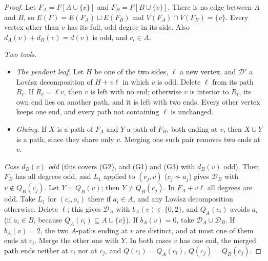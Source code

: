 \documentclass[11pt]{amsart}
\theoremstyle{definition}
\newcommand{\cD}{\mathcal D}
\begin{document}
\begin{proof}
Let $F_A=F[A\cup\{v\}]$ and $F_B=F[B\cup\{v\}]$. There is no edge between $A$ and $B$, so
$E(F)=E(F_A)\sqcup E(F_B)$ and $V(F_A)\cap V(F_B)=\{v\}$. Every vertex other than $v$ has its full,
odd degree in its side. Also $d_A(v)+d_B(v)=d(v)$ is odd, and $c_i\in A$.

\emph{Two tools.}
\begin{itemize}
\item \emph{The pendant leaf.} Let $H$ be one of the two sides, $\ell$ a new vertex, and $\cD'$ a
Lov\'asz decomposition of $H+v\ell$ in which $v$ is odd. Delete $\ell$ from its path $R_\ell$. If $R_\ell=\ell v$, then $v$ is
left with no end; otherwise $v$ is interior to $R_\ell$, its own end lies on another path, and it is left with two ends. Every other
vertex keeps one end, and every path not containing $\ell$ is unchanged.
\item \emph{Gluing.} If $X$ is a path of $F_A$ and $Y$ a path of $F_B$, both ending at $v$, then $X\cup Y$
is a path, since they share only $v$. Merging one such pair removes two ends at $v$.
\end{itemize}

\emph{Case $d_B(v)$ odd} (this covers (G2), and (G1) and (G3) with $d_B(v)$ odd). Then $F_B$ has all
degrees odd, and $L_1$ applied to $(c_j,v)$ ($c_j\not\sim a_j$) gives $\cD_B$ with $v\notin Q_B(c_j)$.
Let $Y=Q_B(v)$; then $Y\ne Q_B(c_j)$. In $F_A+v\ell$ all degrees are odd. Take $L_1$ for
$(c_i,a_i)$ there if $a_i\in A$, and any Lov\'asz decomposition otherwise. Delete $\ell$; this gives $\cD_A$
with $b_A(v)\in\{0,2\}$, and $Q_A(c_i)$ avoids $a_i$ (if $a_i\in B$, because $Q_A(c_i)\subseteq A\cup\{v\}$). If $b_A(v)=0$,
take $\cD_A\cup\cD_B$. If $b_A(v)=2$, the two $A$-paths ending at $v$ are distinct, and at most one of
them ends at $c_i$. Merge the other one with $Y$. In both cases $v$ has one end, the merged path
ends neither at $c_i$ nor at $c_j$, and $Q(c_i)=Q_A(c_i)$, $Q(c_j)=Q_B(c_j)$.


\end{proof}
\end{document}
